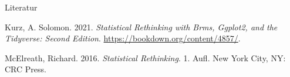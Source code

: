 \documentclass[
  ngerman,
  ignorenonframetext,
]{beamer}
\newlength{\cslhangindent}
\newenvironment{CSLReferences}[2] %
 {%
  \setlength{\parindent}{0pt}
  \ifodd #1 \everypar{\setlength{\hangindent}{\cslhangindent}}\ignorespaces\fi
  \ifnum #2 > 0
  \setlength{\parskip}{#2\baselineskip}
  \fi
 }%
 {}
\begin{document}
\begin{frame}{Literatur}
\protect\hypertarget{literatur}{}
\hypertarget{refs}{}
\begin{CSLReferences}{1}{0}
\leavevmode{}%
Kurz, A. Solomon. 2021. \emph{Statistical Rethinking with Brms, Ggplot2,
and the Tidyverse: {Second} Edition}.
\url{https://bookdown.org/content/4857/}.

\leavevmode{}%
McElreath, Richard. 2016. \emph{Statistical {Rethinking}}. 1. Aufl. {New
York City, NY}: {CRC Press}.

\end{CSLReferences}
\end{frame}
\end{document}
